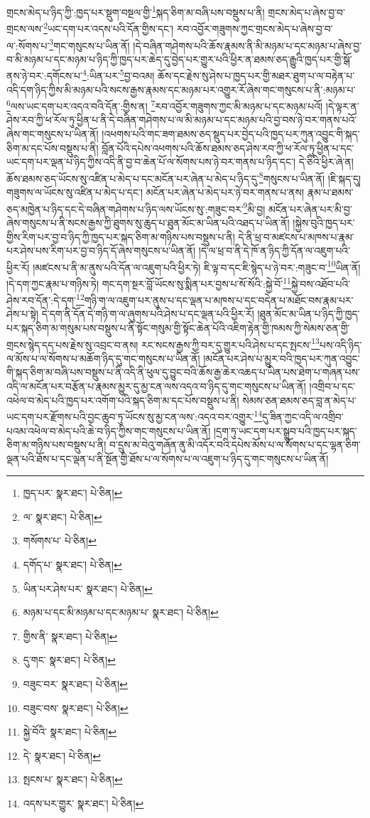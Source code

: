 གྲངས་མེད་པ་ཉིད་ཀྱི་:ཁྱད་པར་སྡུག་བསྔལ་གྱི་\footnote{ཁྱད་པར་  སྣར་ཐང་།  པེ་ཅིན། }སྐད་ཅིག་མ་བཞི་པས་བསྡུས་པ་ནི། གྲངས་མེད་པ་ཞེས་བྱ་བ་གྲངས་ལས་\footnote{ལ་  སྣར་ཐང་།  པེ་ཅིན། }ཡང་དག་པར་འདས་པའི་དོན་གྱིས་དང་། རབ་འབྱོར་གཟུགས་ཀྱང་གྲངས་མེད་པ་ཞེས་བྱ་བ་ལ་:སོགས་པ་\footnote{གསོགས་པ་  པེ་ཅིན། }གང་གསུངས་པ་ཡིན་ནོ། །དེ་བཞིན་གཤེགས་པའི་ཆོས་རྣམས་ནི་མི་མཉམ་པ་དང་མཉམ་པ་ཞེས་བྱ་བ་མི་མཉམ་པ་དང་མཉམ་པ་ཉིད་ཀྱི་ཁྱད་པར་ཆེད་དུ་བྱེད་པར་གྱུར་པའི་ཕྱིར་ན་ཐམས་ཅད་རྒྱུའི་ཁྱད་པར་གྱི་སྒོ་ནས་ཉེ་བར་:དགོངས་པ་\footnote{དགོད་པ་  སྣར་ཐང་།  པེ་ཅིན། }:ཡིན་པར་\footnote{ཡིན་པར་ཤེས་པར་  སྣར་ཐང་།  པེ་ཅིན། }བྱ་བའམ། ཆོས་དང་རྗེས་སུ་ཤེས་པ་ཁྱད་པར་གྱི་མཐར་ཐུག་པ་ལ་བརྟེན་པ་འདི་དག་ཉིད་ཀྱིས་མི་མཉམ་པའི་སངས་རྒྱས་རྣམས་དང་མཉམ་པར་འགྱུར་རོ་ཞེས་གང་གསུངས་པ་ནི་:མཉམ་པ་\footnote{མཉམ་པ་དང་མི་མཉམ་པ་དང་མཉམ་པ་  སྣར་ཐང་།  པེ་ཅིན། }ལས་ཡང་དག་པར་འདའ་བའི་དོན་:གྱིས་ན། \footnote{གྱིས་ནི་  སྣར་ཐང་།  པེ་ཅིན། }རབ་འབྱོར་གཟུགས་ཀྱང་མི་མཉམ་པ་དང་མཉམ་པའོ། །དེ་ལྟར་ན་ཤེས་རབ་ཀྱི་ཕ་རོལ་ཏུ་ཕྱིན་པ་ནི་དེ་བཞིན་གཤེགས་པ་ལ་མི་མཉམ་པ་དང་མཉམ་པའི་བྱ་བས་ཉེ་བར་གནས་པའོ་ཞེས་གང་གསུངས་པ་ཡིན་ནོ། །འཕགས་པའི་གང་ཟག་ཐམས་ཅད་སྡུད་པར་བྱེད་པའི་ཁྱད་པར་ཀུན་འབྱུང་གི་སྐད་ཅིག་མ་དང་པོས་བསྡུས་པ་ནི། བློན་པོའི་དཔེས་འཕགས་པའི་ཆོས་ཐམས་ཅད་ཤེས་རབ་ཀྱི་ཕ་རོལ་ཏུ་ཕྱིན་པ་དང་ཡང་དག་པར་ལྡན་པ་ཉིད་ཀྱིས་འདི་ནི་བྱ་བ་ཆེན་པོ་ལ་སོགས་པས་ཉེ་བར་གནས་པ་ཉིད་དང་། དེ་ཅིའི་ཕྱིར་ཞེ་ན། ཆོས་ཐམས་ཅད་ཡོངས་སུ་འཛིན་པ་མེད་པ་དང་མངོན་པར་ཞེན་པ་མེད་པ་ཉིད་དུ་\footnote{དུ་གང་  སྣར་ཐང་།  པེ་ཅིན། }གསུངས་པ་ཡིན་ནོ། །ཇི་སྐད་དུ། གཟུགས་ལ་ཡོངས་སུ་འཛིན་པ་མེད་པ་དང་། མངོན་པར་ཞེན་པ་མེད་པར་ཉེ་བར་གནས་པ་ནས། རྣམ་པ་ཐམས་ཅད་མཁྱེན་པ་ཉིད་དང་དེ་བཞིན་གཤེགས་པ་ཉིད་ལས་ཡོངས་སུ་:གཟུང་བར་\footnote{བཟུང་བར་  སྣར་ཐང་།  པེ་ཅིན། }མི་བྱ། མངོན་པར་ཞེན་པར་མི་བྱ་ཞེས་གསུངས་པ་ནི་སངས་རྒྱས་ཀྱི་ཐུགས་སུ་ཆུད་པ་ཐུན་མོང་མ་ཡིན་པའི་འཐད་པ་ཡིན་ནོ། །སྐྱེས་བུའི་ཁྱད་པར་གྱིས་རིག་པར་བྱ་བ་ཉིད་ཀྱི་ཁྱད་པར་སྐད་ཅིག་མ་གཉིས་པས་བསྡུས་པ་ནི། དེ་ནི་ཕྲ་བ་མཛངས་པ་མཁས་པ་རྣམ་པར་ཤེས་པས་རིག་པར་བྱ་བ་ཉིད་དོ་ཞེས་གསུངས་པ་ཡིན་ནོ། །དེ་ལ་ཕྲ་བ་ནི་དེ་ཁོ་ན་ཉིད་ཀྱི་དོན་ལ་འཇུག་པའི་ཕྱིར་རོ། །མཛངས་པ་ནི་མ་ནུས་པའི་དོན་ལ་འཇུག་པའི་ཕྱིར་ཏེ། ཇི་ལྟ་བ་དང་ཇི་སྙེད་པ་ཉེ་བར་:གཟུང་བ་\footnote{བཟུང་བས་  སྣར་ཐང་།  པེ་ཅིན། }ཡིན་ནོ། །དེ་དག་ཀྱང་རྣམ་པ་གཉིས་ཏེ། གང་དག་སྔར་བློ་ཡོངས་སུ་སྨིན་པར་བྱས་པ་སོ་སོའི་:སྐྱེ་བོ་\footnote{སྐྱེ་བོའི་  སྣར་ཐང་།  པེ་ཅིན། }སྐྱེ་བས་འཐོབ་པའི་ཤེས་རབ་དོན་:དེ་དག་\footnote{དེ་  སྣར་ཐང་།  པེ་ཅིན། }གཉི་ག་ལ་འཇུག་པར་ནུས་པ་དང་ལྡན་པ་མཁས་པ་དང་བདེན་པ་མཐོང་བས་རྣམ་པར་ཤེས་པ་སྟེ། དེ་དག་ནི་དོན་དེ་གཉི་ག་ལ་ཞུགས་པའི་ཤེས་པ་དང་ལྡན་པའི་ཕྱིར་རོ། །ཐུན་མོང་མ་ཡིན་པ་ཉིད་ཀྱི་ཁྱད་པར་སྐད་ཅིག་མ་གསུམ་པས་བསྡུས་པ་ནི་སྟོང་གསུམ་གྱི་སྟོང་ཆེན་པོའི་འཇིག་རྟེན་གྱི་ཁམས་ཀྱི་སེམས་ཅན་གྱི་གྲངས་སྙེད་དད་པས་རྗེས་སུ་འབྲང་བ་ནས། རང་སངས་རྒྱས་ཀྱི་བར་དུ་གྱུར་པའི་ཤེས་པ་དང་སྤངས་\footnote{སྤངས་པ་  སྣར་ཐང་།  པེ་ཅིན། }པས་འདི་ཉིད་ལ་མོས་པ་ལ་སོགས་པ་མཆོག་ཉིད་དུ་གང་གསུངས་པ་ཡིན་ནོ། །མངོན་པར་ཤེས་པ་མྱུར་བའི་ཁྱད་པར་ཀུན་འབྱུང་གི་སྐད་ཅིག་མ་བཞི་པས་བསྡུས་པ་ནི་འདི་ནི་ཕུལ་དུ་བྱུང་བའི་ཆོས་རྒྱ་ཆེར་འཆད་པ་ཡིན་པས་ཐེག་པ་གཞན་པས་འདི་ལ་མངོན་པར་བརྩོན་པ་རྣམས་མྱུར་དུ་མྱ་ངན་ལས་འདའ་བ་ཉིད་དུ་གང་གསུངས་པ་ཡིན་ནོ། །འགྲིབ་པ་དང་འཕེལ་བ་མེད་པའི་ཁྱད་པར་འགོག་པའི་སྐད་ཅིག་མ་དང་པོས་བསྡུས་པ་ནི། སེམས་ཅན་ཐམས་ཅད་བླ་ན་མེད་པ་ཡང་དག་པར་རྫོགས་པའི་བྱང་ཆུབ་ཏུ་ཡོངས་སུ་མྱ་ངན་ལས་:འདའ་བར་འགྱུར་\footnote{འདས་པར་གྱུར་  སྣར་ཐང་།  པེ་ཅིན། }དུ་ཟིན་ཀྱང་འདི་ལ་འགྲིབ་པའམ་འཕེལ་བ་མེད་པའི་ཆེ་བ་ཉིད་ཀྱིས་གང་གསུངས་པ་ཡིན་ནོ། །དྲག་ཏུ་ཡང་དག་པར་སྒྲུབ་པའི་ཁྱད་པར་སྐད་ཅིག་མ་གཉིས་པས་བསྡུས་པ་ནི། བ་དྲུས་མ་བེའུ་གཞོན་ནུ་མི་འདོར་བའི་དཔེས་མོས་པ་ལ་སོགས་པ་དང་ལྷན་ཅིག་ལྡན་པའི་ཐོས་པ་དང་ལྡན་པ་ནི་སྔོན་གྱི་ཐོས་པ་ལ་སོགས་པ་ལ་འཇུག་པ་ཉིད་དུ་གང་གསུངས་པ་ཡིན་ནོ། 